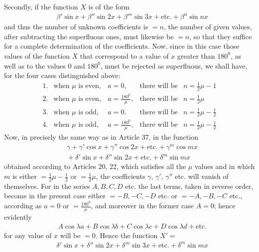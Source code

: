 \begingroup
\renewcommand{\arraystretch}{1.45}

Secondly, if the function $X$ is of the form
\[
\begin{aligned}
&\beta'\sin x+\beta''\sin 2x+\beta'''\sin 3x+\mathrm{etc.}+\beta^n\sin nx
\end{aligned}
\]
and thus the number of unknown coefficients is $=n$, the number of given values,
after subtracting the superfluous ones, must likewise be $=n$, so that they suffice for a complete determination of the coefficients. Now, since in this case those values of the function $X$ that correspond to a value of $x$ greater than $180^0$, as well as to the values $0$ and $180^0$, must be rejected as superfluous, we shall have, for the four cases distinguished above:
\[
\begin{array}{rllcl}
1.&\text{when }\mu\text{ is even},&a=0,&\text{there will be}&n=\frac12\mu-1\\
2.&\text{when }\mu\text{ is even},&a=\frac{180^0}{\mu},&\text{there will be}&n=\frac12\mu\\
3.&\text{when }\mu\text{ is odd},&a=0.&\text{there will be}&n=\frac12\mu-\frac12\\
4.&\text{when }\mu\text{ is odd},&a=\frac{180^0}{\mu},&\text{there will be}&n=\frac12\mu-\frac12
\end{array}
\]
Now, in precisely the same way as in Article 37, in the function
\[
\begin{aligned}
&\gamma+\gamma'\cos x+\gamma''\cos 2x+\text{etc.}+\gamma^m\cos mx\\[6pt]
&{}+\delta'\sin x+\delta''\sin 2x+\text{etc.}+\delta^m\sin mx
\end{aligned}
\]
obtained according to Articles 20, 22, which satisfies all the $\mu$ values and in which $m$ is either $=\frac12\mu-\frac12$ or $=\frac12\mu$, the coefficients $\gamma$, $\gamma'$, $\gamma''$ etc. will vanish of themselves. For in the series $A,B,C,D$ etc. the last terms, taken in reverse order, become in the present case either $=-B,-C,-D$ etc. or $=-A,-B,-C$ etc., according as $a=0$ or $=\frac{180^0}{\mu}$, and moreover in the former case $A=0$; hence evidently
\[
\begin{aligned}
&A\cos\lambda a+B\cos\lambda b+C\cos\lambda c+D\cos\lambda d+\text{etc.}
\end{aligned}
\]
for any value of $x$ will be $=0$. 
Hence the function $X'=$
\[
\begin{aligned}
&\delta'\sin x+\delta''\sin 2x+\delta'''\sin 3x+\text{etc.}+\delta^m\sin mx
\end{aligned}
\]

